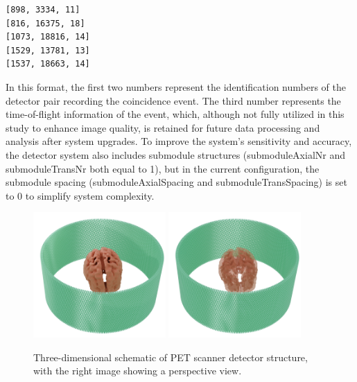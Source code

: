 \documentclass[
reprint,
superscriptaddress,
nofootinbib,
amsmath,amssymb,
aps,
prd,
]{revtex4-2}
\begin{document}
\begin{verbatim}
[898, 3334, 11]
[816, 16375, 18]
[1073, 18816, 14]
[1529, 13781, 13]
[1537, 18663, 14]
\end{verbatim}

In this format, the first two numbers represent the identification numbers of the detector pair recording the coincidence event. The third number represents the time-of-flight information of the event, which, although not fully utilized in this study to enhance image quality, is retained for future data processing and analysis after system upgrades. To improve the system's sensitivity and accuracy, the detector system also includes submodule structures (submoduleAxialNr and submoduleTransNr both equal to 1), but in the current configuration, the submodule spacing (submoduleAxialSpacing and submoduleTransSpacing) is set to 0 to simplify system complexity.


\begin{figure}[htbp]
\centering
\vspace{-0.2cm}
\includegraphics[width=0.45\textwidth]{Images/Thehumanbrainisnotmissing3}
\includegraphics[width=0.45\textwidth]{Images/Thehumanbrainisnotmissing4}
\vspace{-0.2cm}
\caption{Three-dimensional schematic of PET scanner detector structure, with the right image showing a perspective view.}
\vspace{-0.2cm}
\label{fig:pet_structures}
\end{figure}
\end{document}
